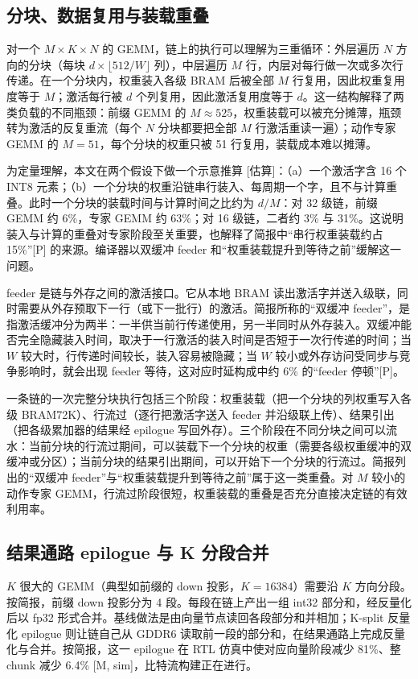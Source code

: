 \documentclass[a4paper,10.5pt]{ctexart}
\newcommand{\tP}{\textsf{[P]}}              %
\newcommand{\tMsim}{\textsf{[M, sim]}}      %
\newcommand{\tE}{\textsf{[估算]}}           %
\begin{document}
\subsection{分块、数据复用与装载重叠}

对一个 $M\times K\times N$ 的 GEMM，链上的执行可以理解为三重循环：外层遍历 $N$ 方向的分块（每块 $d\times\lfloor512/W\rfloor$ 列），中层遍历 $M$ 行，内层对每行做一次或多次行传递。在一个分块内，权重装入各级 BRAM 后被全部 $M$ 行复用，因此权重复用度等于 $M$；激活每行被 $d$ 个列复用，因此激活复用度等于 $d$。这一结构解释了两类负载的不同瓶颈：前缀 GEMM 的 $M\approx525$，权重装载可以被充分摊薄，瓶颈转为激活的反复重流（每个 $N$ 分块都要把全部 $M$ 行激活重读一遍）；动作专家 GEMM 的 $M=51$，每个分块的权重只被 51 行复用，装载成本难以摊薄。

为定量理解，本文在两个假设下做一个示意推算 \tE：（a）一个激活字含 16 个 INT8 元素；（b）一个分块的权重沿链串行装入、每周期一个字，且不与计算重叠。此时一个分块的装载时间与计算时间之比约为 $d/M$：对 32 级链，前缀 GEMM 约 6\%，专家 GEMM 约 63\%；对 16 级链，二者约 3\% 与 31\%。这说明装入与计算的重叠对专家阶段至关重要，也解释了简报中“串行权重装载约占 15\%”\tP{} 的来源。编译器以双缓冲 feeder 和“权重装载提升到等待之前”缓解这一问题。

feeder 是链与外存之间的激活接口。它从本地 BRAM 读出激活字并送入级联，同时需要从外存预取下一行（或下一批行）的激活。简报所称的“双缓冲 feeder”，是指激活缓冲分为两半：一半供当前行传递使用，另一半同时从外存装入。双缓冲能否完全隐藏装入时间，取决于一行激活的装入时间是否短于一次行传递的时间；当 $W$ 较大时，行传递时间较长，装入容易被隐藏；当 $W$ 较小或外存访问受同步与竞争影响时，就会出现 feeder 等待，这对应时延构成中约 6\% 的“feeder 停顿”\tP。

一条链的一次完整分块执行包括三个阶段：权重装载（把一个分块的列权重写入各级 BRAM72K）、行流过（逐行把激活字送入 feeder 并沿级联上传）、结果引出（把各级累加器的结果经 epilogue 写回外存）。三个阶段在不同分块之间可以流水：当前分块的行流过期间，可以装载下一个分块的权重（需要各级权重缓冲的双缓冲或分区）；当前分块的结果引出期间，可以开始下一个分块的行流过。简报列出的“双缓冲 feeder”与“权重装载提升到等待之前”属于这一类重叠。对 $M$ 较小的动作专家 GEMM，行流过阶段很短，权重装载的重叠是否充分直接决定链的有效利用率。

\subsection{结果通路 epilogue 与 K 分段合并}\label{sec:epilogue}

$K$ 很大的 GEMM（典型如前缀的 down 投影，$K=16384$）需要沿 $K$ 方向分段。按简报，前缀 down 投影分为 4 段。每段在链上产出一组 int32 部分和，经反量化后以 fp32 形式合并。基线做法是由向量节点读回各段部分和并相加；K-split 反量化 epilogue 则让链自己从 GDDR6 读取前一段的部分和，在结果通路上完成反量化与合并。按简报，这一 epilogue 在 RTL 仿真中使对应向量阶段减少 81\%、整 chunk 减少 6.4\% \tMsim，比特流构建正在进行。
\end{document}
